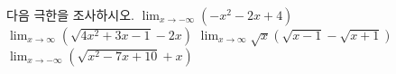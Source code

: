 다음 극한을 조사하시오.
 $\displaystyle\lim_{x\to -\infty}(-x^2-2x+4)$
 $\displaystyle\lim_{x\to\infty}(\sqrt{4x^2+3x-1}-2x)$
 $\displaystyle\lim_{x\to\infty}\sqrt{x}(\sqrt{x-1}-\sqrt{x+1})$
 $\displaystyle\lim_{x\to -\infty}(\sqrt{x^2-7x+10}+x)$
